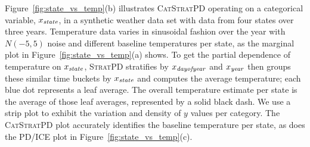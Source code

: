 \documentclass[12pt]{article}
\newcommand{\figref}[1]{Figure~\ref{#1}}
\newcommand{\spd}{\fontfamily{cmr}\textsc{\small StratPD}}
\newcommand{\cspd}{\fontfamily{cmr}\textsc{\small CatStratPD}}
\begin{document}
\figref{fig:state_vs_temp}(b) illustrates \cspd{} operating on a categorical variable, $x_{\it state}$, in a synthetic weather data set with data from four states over three years. Temperature data varies in sinusoidal fashion over the year with $N(-5,5)$ noise and different baseline temperatures per state, as the marginal plot in \figref{fig:state_vs_temp}(a) shows. To get the partial dependence of temperature on $x_{\it state}$, \spd{} stratifies by $x_{\it dayofyear}$ and $x_{\it year}$ then groups these similar time buckets by $x_{\it state}$ and computes the average temperature; each blue dot represents a leaf average. The overall temperature estimate per state is the average of those leaf averages, represented by a solid black dash. We use a strip plot to exhibit the variation and density of $y$ values per category. The \cspd{} plot accurately identifies the baseline temperature per state, as does the PD/ICE plot in \figref{fig:state_vs_temp}(c).
\end{document}
